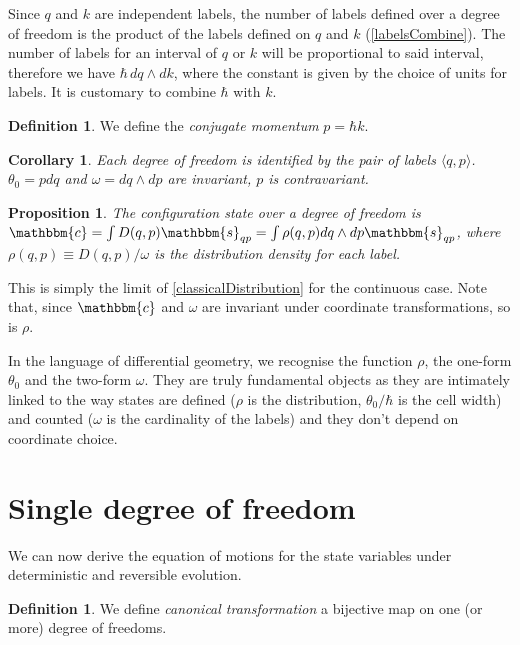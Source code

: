 \documentclass[aps,pra,10pt,twocolumn,floatfix,nofootinbib]{revtex4-1}
\newtheorem{cor}[thm]{Corollary}
\newtheorem{prop}[thm]{Proposition}
\theoremstyle{definition}
\newtheorem{defn}[thm]{Definition}
\begin{document}
Since $q$ and $k$ are independent labels, the number of labels defined over a degree of freedom is the product of the labels defined on $q$ and $k$ (\ref{labelsCombine}). The number of labels for an interval of $q$ or $k$ will be proportional to said interval, therefore we have $\hbar \, dq \wedge dk$, where the constant is given by the choice of units for labels. It is customary to combine $\hbar$ with $k$.

\begin{defn}\label{sdof}
We define the \emph{conjugate momentum} $p=\hbar k$.
\end{defn}

\begin{cor}\label{continuousLabels}
Each degree of freedom is identified by the pair of labels $\langle q,p \rangle$. $\theta_0 = p dq$ and $\omega = dq \wedge dp$ are invariant, $p$ is contravariant.
\end{cor}

\begin{prop}\label{continuousLabelDist}
The configuration state over a degree of freedom is $\mathbbm{c}=\int D(q,p) \mathbbm{s}_{qp} = \int \rho(q,p) dq \wedge dp \mathbbm{s}_{qp}$, where $\rho(q,p)\equiv D(q,p) / \omega$ is the distribution density for each label.
\end{prop}

This is simply the limit of \ref{classicalDistribution} for the continuous case. Note that, since $\mathbbm{c}$ and $\omega$ are invariant under coordinate transformations, so is $\rho$.

In the language of differential geometry, we recognise the function $\rho$, the one-form $\theta_0$ and the two-form $\omega$. They are truly fundamental objects as they are intimately linked to the way states are defined ($\rho$ is the distribution, $\theta_0 / \hbar$ is the cell width) and counted ($\omega$ is the cardinality of the labels) and they don't depend on coordinate choice.


\section{Single degree of freedom}

We can now derive the equation of motions for the state variables under deterministic and reversible evolution.

\begin{defn}\label{canonical}
We define \emph{canonical transformation} a bijective map on one (or more) degree of freedoms.
\end{defn}
\end{document}
